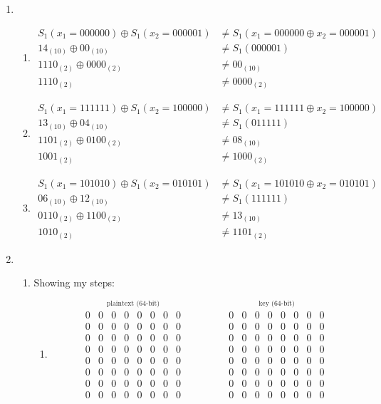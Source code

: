 \documentclass[12pt]{article}
\begin{document}
\begin{enumerate}
	\item
		\begin{enumerate}
		\item
			\begin{align*}
				S_1(x_1=000000) \oplus S_1(x_2=000001) &\not= S_1(x_1=000000 \oplus x_2=000001)\\
				14_{(10)} \oplus 00_{(10)} &\not= S_1(000001)\\
				1110_{(2)} \oplus 0000_{(2)} &\not= 00_{(10)}\\
				1110_{(2)} &\not= 0000_{(2)}
			\end{align*}
		\item
			\begin{align*}
				S_1(x_1=111111) \oplus S_1(x_2=100000) &\not= S_1(x_1=111111 \oplus x_2=100000)\\
				13_{(10)} \oplus 04_{(10)} &\not= S_1(011111)\\
				1101_{(2)} \oplus 0100_{(2)} &\not= 08_{(10)}\\
				1001_{(2)} &\not= 1000_{(2)}
			\end{align*}
		\item
			\begin{align*}
				S_1(x_1=101010) \oplus S_1(x_2=010101) &\not= S_1(x_1=101010 \oplus x_2=010101)\\
				06_{(10)} \oplus 12_{(10)} &\not= S_1(111111)\\
				0110_{(2)} \oplus 1100_{(2)} &\not= 13_{(10)}\\
				1010_{(2)} &\not= 1101_{(2)}
			\end{align*}
		\end{enumerate}
		
	\item
		\begin{enumerate}
		\item Showing my steps:
			\begin{enumerate}
			\item			
				\[
				\stackrel{\mbox{plaintext (64-bit)}}{
				\begin{matrix}
					0&0&0&0&0&0&0&0\\ 
					0&0&0&0&0&0&0&0\\
					0&0&0&0&0&0&0&0\\
					0&0&0&0&0&0&0&0\\
					0&0&0&0&0&0&0&0\\
					0&0&0&0&0&0&0&0\\
					0&0&0&0&0&0&0&0\\
					0&0&0&0&0&0&0&0
				\end{matrix}}\quad\quad\quad\quad
				\stackrel{\mbox{key (64-bit)}}{
				\begin{matrix}
					0&0&0&0&0&0&0&0\\ 
					0&0&0&0&0&0&0&0\\
					0&0&0&0&0&0&0&0\\
					0&0&0&0&0&0&0&0\\
					0&0&0&0&0&0&0&0\\
					0&0&0&0&0&0&0&0\\
					0&0&0&0&0&0&0&0\\
					0&0&0&0&0&0&0&0
				\end{matrix}}
				\]
				

\end{enumerate}
\end{enumerate}
\end{enumerate}
\end{document}
